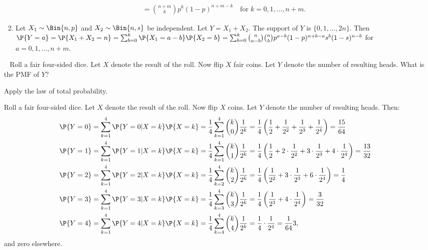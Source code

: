 \begin{exercise}
\begin{solution}
\begin{enumerate}
\begin{align*}
					 & = \binom{n + m}{k} p^k (1 - p)^{n + m - k}\quad\text{for }k=0,1,\dots,n+m.
				 \end{align*}
 			\item Let $X_1\sim \Bin{n, p}$ and $X_2\sim \Bin{n, s}$ be independent. Let $Y=X_1+X_2$. The support of $Y$ is $\{0, 1, \ldots, 2n\}$. Then $\P{Y = a} = \P{X_1 + X_2 = n} = \sum_{b = 0}^k \P{X_1 = a - b} \P{X_2 = b} = \sum_{b = 0}^k \binom{n}{a - b} \binom{n}{b} p^{a - b} (1 - p)^{n + b - a} s^b (1 - s)^{n - b}$ for $a=0,1,\dots,n+m$.
 		\end{enumerate}
 	\end{solution}
\end{exercise}

\begin{exercise}~
	Roll a fair four-sided dice. Let $X$ denote the result of the roll. Now flip $X$ fair coins. Let $Y$ denote the number of resulting heads. What is the PMF of $Y$?
	\begin{hint}
		Apply the law of total probability.
	\end{hint}
 	\begin{solution}
		Roll a fair four-sided dice. Let $X$ denote the result of the roll. Now flip $X$ coins. Let $Y$ denote the number of resulting heads. Then:
 		\begin{align*}
 			\P{Y = 0} & = \sum_{k = 1}^4 \P{Y = 0 | X = k} \P{X = k} = \frac{1}{4} \sum_{k = 1}^4 \binom{k}{0} \frac{1}{2^k} = \frac{1}{4} \left(\frac{1}{2} + \frac{1}{2^2} + \frac{1}{2^3} + \frac{1}{2^4}\right) = \frac{15}{64} \\
 			\P{Y = 1} & = \sum_{k = 1}^4 \P{Y = 1 | X = k} \P{X = k} = \frac{1}{4} \sum_{k = 1}^4 \binom{k}{1} \frac{1}{2^k} = \frac{1}{4} \left(\frac{1}{2} + 2 \cdot \frac{1}{2^2} + 3 \cdot \frac{1}{2^3} + 4 \cdot \frac{1}{2^4}\right) = \frac{13}{32} \\
 			\P{Y = 2} & = \sum_{k = 1}^4 \P{Y = 2 | X = k} \P{X = k} = \frac{1}{4} \sum_{k = 2}^4 \binom{k}{2} \frac{1}{2^k} = \frac{1}{4} \left(\frac{1}{2^2} + 3 \cdot \frac{1}{2^3} + 6 \cdot \frac{1}{2^4}\right) = \frac{1}{4} \\
 			\P{Y = 3} & = \sum_{k = 1}^4 \P{Y = 3 | X = k} \P{X = k} = \frac{1}{4} \sum_{k = 3}^4 \binom{k}{3} \frac{1}{2^k} = \frac{1}{4} \left(\frac{1}{2^3} + 4 \cdot \frac{1}{2^4}\right) = \frac{3}{32} \\
 			\P{Y = 4} & = \sum_{k = 1}^4 \P{Y = 4 | X = k} \P{X = k} = \frac{1}{4} \sum_{k = 4}^4 \binom{k}{4} \frac{1}{2^k} = \frac{1}{4} \cdot \frac{1}{2^4} = \frac{1}{64}3,
 		\end{align*} 
		and zero elsewhere.
 	\end{solution}
\end{exercise}

